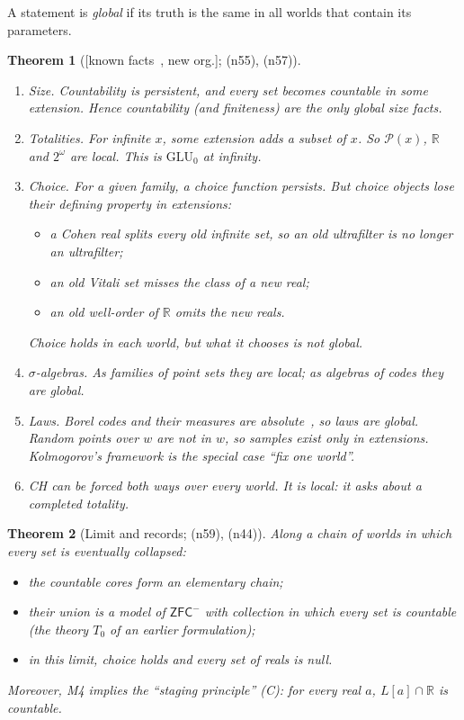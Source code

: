 \documentclass[11pt]{article}
\newtheorem{theorem}{Theorem}[section]
\theoremstyle{definition}
\theoremstyle{remark}
\newcommand{\ZFC}{\mathsf{ZFC}}
\newcommand{\GLU}{\mathrm{GLU}}
\newcommand{\R}{\mathbb{R}}
\newcommand{\status}[1]{\textsf{[#1]}}
\newcommand{\note}[1]{\textsf{(n#1)}}
\begin{document}
A statement is \emph{global} if its truth is the same in all worlds that contain its parameters.

\begin{theorem}[\status{known facts~\cite{Jech03,BartoszynskiJudah95}, new org.}; \note{55}, \note{57}]\label{thm:globallocal}
\leavevmode
\begin{enumerate}
\item \emph{Size.} Countability is persistent, and every set becomes countable in some extension. Hence countability (and finiteness) are the only global size facts.
\item \emph{Totalities.} For infinite $x$, some extension adds a subset of $x$. So $\mathcal P(x)$, $\R$ and $2^\omega$ are local. This is $\GLU_0$ at infinity.
\item \emph{Choice.} For a given family, a choice function persists. But choice objects lose their defining property in extensions:
  \begin{itemize}
  \item a Cohen real splits every old infinite set, so an old ultrafilter is no longer an ultrafilter;
  \item an old Vitali set misses the class of a new real;
  \item an old well-order of $\R$ omits the new reals.
  \end{itemize}
  Choice holds in each world, but what it chooses is not global.
\item \emph{$\sigma$-algebras.} As families of point sets they are local; as algebras of codes they are global.
\item \emph{Laws.} Borel codes and their measures are absolute~\cite{Solovay70,Shoenfield61}, so laws are global. Random points over $w$ are not in $w$, so samples exist only in extensions. Kolmogorov's framework is the special case ``fix one world''.
\item \emph{CH} can be forced both ways over every world. It is local: it asks about a completed totality.
\end{enumerate}
\end{theorem}

\begin{theorem}[Limit and records; \note{59}, \note{44}]\label{thm:limit}
Along a chain of worlds in which every set is eventually collapsed:
\begin{itemize}
\item the countable cores form an elementary chain;
\item their union is a model of $\ZFC^-$ with collection in which every set is countable (the theory $T_0$ of an earlier formulation);
\item in this limit, choice holds and every set of reals is null.
\end{itemize}
Moreover, M4 implies the ``staging principle'' (C): for every real $a$, $L[a]\cap\R$ is countable.
\end{theorem}
\end{document}
